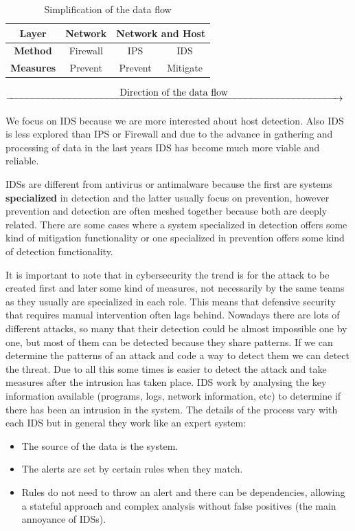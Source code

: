 \begin{table}[H]
	\centering
	\caption{Simplification of the data flow}
\linej
	\begin{tabular}{|c|c|c|c|}
	\hline
		\textbf{Layer} & \textbf{Network} & \multicolumn{2}{c|}{\textbf{Network and Host}}\\ \hline
		\textbf{Method} & Firewall & IPS & IDS\\ \hline
		\textbf{Measures} & Prevent & Prevent & Mitigate\\ \hline
	\end{tabular}
\end{table}
$\xrightarrow{\makebox[\textwidth]{Direction of the data flow}}$


\linej
\linej
We focus on IDS because we are more interested about host detection. Also IDS is less explored than IPS or Firewall and due to the advance in gathering and processing of data in the last years IDS has become much more viable and reliable.

\linej
\linej
IDSs are different from antivirus or antimalware because the first are systems \textbf{specialized} in detection and the latter usually focus on prevention, however prevention and detection are often meshed together because both are deeply related. There are some cases where a system specialized in detection offers some kind of mitigation functionality or one specialized in prevention offers some kind of detection functionality.

\linej
\linej
It is important to note that in cybersecurity the trend is for the attack to be created first and later some kind of measures, not necessarily by the same teams as they usually are specialized in each role. This means that defensive security that requires manual intervention often lags behind.
\linej
Nowadays there are lots of different attacks, so many that their detection could be almost impossible one by one, but most of them can be detected because they share patterns. If we can determine the patterns of an attack and code a way to detect them we can detect the threat. Due to all this some times is easier to detect the attack and take measures after the intrusion has taken place.
\linej
\linej
IDS work by analysing the key information available (programs, logs, network information, etc) to determine if there has been an intrusion in the system. The details of the process vary with each IDS but in general they work like an expert system:
\begin{itemize}
	\item The source of the data is the system.
	\item The alerts are set by certain rules when they match.
	\item Rules do not need to throw an alert and there can be dependencies, allowing a stateful approach and complex analysis without false positives (the main annoyance of IDSs).
\end{itemize}

